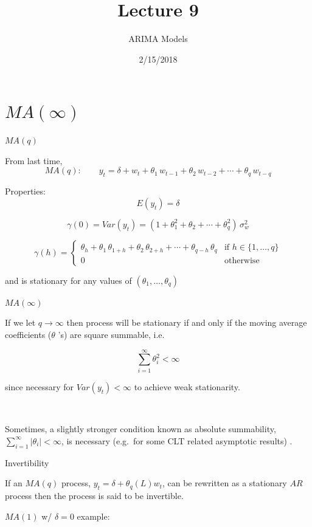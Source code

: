 \documentclass[11pt,ignorenonframetext,]{beamer}
\title{Lecture 9}
\subtitle{ARIMA Models}
\date{2/15/2018}
\begin{document}
\frame{\titlepage}

\hypertarget{mainfty}{%
\section{\texorpdfstring{\(MA(\infty)\)}{MA(\textbackslash{}infty)}}\label{mainfty}}

\begin{frame}[t]{%
\protect\hypertarget{maq}{%
\(MA(q)\)}}

From last time,
\[ MA(q): \qquad y_t = \delta + w_t + \theta_1 \, w_{t-1} + \theta_2 \, w_{t-2} + \cdots + \theta_q \, w_{t-q} \]

Properties: \[E(y_t) = \delta\]

\[
\gamma(0) = Var(y_t) = (1 + \theta_1^2 + \theta_2 + \cdots + \theta_q^2) \, \sigma_w^2
\]

\[
\gamma(h) = 
\begin{cases}
\theta_h + \theta_1 \, \theta_{1+h} + \theta_2 \, \theta_{2+h} + \cdots + \theta_{q-h}\, \theta_{q} & \text{if } h\in\{1,\ldots,q\} \\
0 & \text{otherwise}
\end{cases}
\]

and is stationary for any values of \((\theta_1, \ldots,\theta_q)\)

\end{frame}

\begin{frame}[t]{%
\protect\hypertarget{mainfty-1}{%
\(MA(\infty)\)}}

If we let \(q \to \infty\) then process will be stationary if and only
if the moving average coefficients (\(\theta\) ’s) are square summable,
i.e.

\[ \sum_{i=1}^\infty \theta_i^2 < \infty \]

since necessary for \(Var(y_t) < \infty\) to achieve weak stationarity.

\(~\)

Sometimes, a slightly stronger condition known as absolute summability,
\(\sum_{i=1}^\infty |\theta_i| < \infty\), is necessary (e.g.~for some
CLT related asymptotic results) .

\end{frame}

\begin{frame}[t]{%
\protect\hypertarget{invertibility}{%
Invertibility}}

If an \(MA(q)\) process, \(y_t = \delta + \theta_q(L) w_t\), can be
rewritten as a stationary \(AR\) process then the process is said to be
invertible.

\(MA(1)\) w/ \(\delta=0\) example:

\end{frame}
\end{document}
